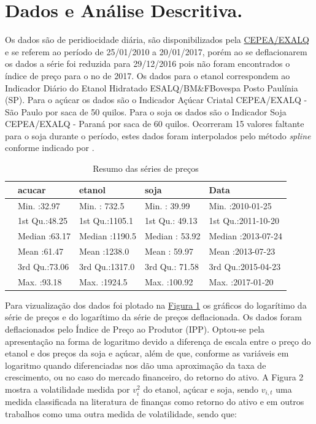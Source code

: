 \section{Dados e Análise
Descritiva.}\label{dados-e-analise-descritiva.}

Os dados são de peridiocidade diária, são disponibilizados pela
\href{http://www.cepea.esalq.usp.br/br/consultas-ao-banco-de-dados-do-site.aspx}{CEPEA/EXALQ}
e se referem ao período de 25/01/2010 a 20/01/2017, porém ao se
deflacionarem os dados a série foi reduzida para 29/12/2016 pois não
foram encontrados o índice de preço para o no de 2017. Os dados para o
etanol correspondem ao Indicador Diário do Etanol Hidratado
ESALQ/BM\&FBovespa Posto Paulínia (SP). Para o açúcar os dados são o
Indicador Açúcar Criatal CEPEA/EXALQ - São Paulo por saca de 50 quilos.
Para o soja os dados são o Indicador Soja CEPEA/EXALQ - Paraná por saca
de 60 quilos. Ocorreram 15 valores faltante para o soja durante o
período, estes dados foram interpolados pelo método \emph{spline}
conforme indicado por .

\begin{longtable}[t]{lllll}
\caption{\label{tab:unnamed-chunk-5}Resumo das séries de preços}\\
\toprule
  &     acucar &     etanol &      soja &      Data\\
\midrule
 & Min.   :32.97 & Min.   : 732.5 & Min.   : 39.99 & Min.   :2010-01-25\\
 & 1st Qu.:48.25 & 1st Qu.:1105.1 & 1st Qu.: 49.13 & 1st Qu.:2011-10-20\\
 & Median :63.17 & Median :1190.5 & Median : 53.92 & Median :2013-07-24\\
 & Mean   :61.47 & Mean   :1238.0 & Mean   : 59.97 & Mean   :2013-07-23\\
 & 3rd Qu.:73.06 & 3rd Qu.:1317.0 & 3rd Qu.: 71.58 & 3rd Qu.:2015-04-23\\
 & Max.   :93.18 & Max.   :1924.5 & Max.   :100.92 & Max.   :2017-01-20\\
\bottomrule
\end{longtable}

Para vizualização dos dados foi plotado na
\protect\hyperlink{figura1}{Figura 1} os gráficos do logarítimo da série
de preços e do logarítimo da série de preços deflacionada. Os dados
foram deflacionados pelo Índice de Preço ao Produtor (IPP). Optou-se
pela apresentação na forma de logaritmo devido a diferença de escala
entre o preço do etanol e dos preços da soja e açúcar, além de que,
conforme  as variáveis em logaritmo quando diferenciadas nos
dão uma aproximação da taxa de crescimento, ou no caso do mercado
financeiro, do retorno do ativo. A Figura 2 mostra a volatilidade medida
por \(v_i^2\) do etanol, açúcar e soja, sendo \(v_{i,t}\) uma medida
classificada na literatura de finanças como retorno do ativo e em outros
trabalhos como uma outra medida de volatilidade, sendo que:

